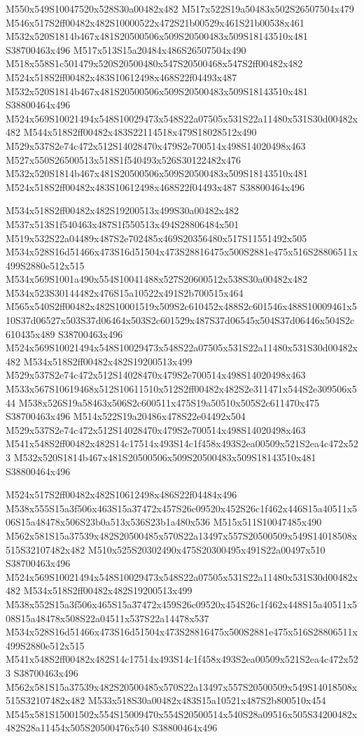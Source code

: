 \documentclass{article}
\begin{document}
\begin{multicols}{2}
M550x549S10047520x528S30a00482x482 M517x522S19a50483x502S26507504x479 M546x517S2ff00482x482S10000522x472S21b00529x461S21b00538x461 M532x520S1814b467x481S20500506x509S20500483x509S18143510x481 S38700463x496 M517x513S15a20484x486S26507504x490 M518x558S1c501479x520S20500480x547S20500468x547S2ff00482x482 M524x518S2ff00482x483S10612498x468S22f04493x487 M532x520S1814b467x481S20500506x509S20500483x509S18143510x481 S38800464x496 M524x569S10021494x548S10029473x548S22a07505x531S22a11480x531S30d00482x482 M544x518S2ff00482x483S22114518x479S18028512x490 M529x537S2e74c472x512S14028470x479S2e700514x498S14020498x463 M527x550S26500513x518S1f540493x526S30122482x476 M532x520S1814b467x481S20500506x509S20500483x509S18143510x481 M524x518S2ff00482x483S10612498x468S22f04493x487 S38800464x496

M534x518S2ff00482x482S19200513x499S30a00482x482 M537x513S1f540463x487S1f550513x494S28806484x501 M519x532S22a04489x487S2e702485x469S20356480x517S11551492x505 M534x528S16d51466x473S16d51504x473S28816475x500S2881e475x516S28806511x499S2880e512x515 M534x569S1001a490x554S10041488x527S20600512x538S30a00482x482 M534x523S30144482x476S15a10522x491S2b700515x464 M565x540S2ff00482x482S10001519x509S2c610452x488S2c601546x488S10009461x510S37d06527x503S37d06464x503S2c601529x487S37d06545x504S37d06446x504S2c610435x489 S38700463x496 M524x569S10021494x548S10029473x548S22a07505x531S22a11480x531S30d00482x482 M534x518S2ff00482x482S19200513x499 M529x537S2e74c472x512S14028470x479S2e700514x498S14020498x463 M533x567S10619468x512S10611510x512S2ff00482x482S2e311471x544S2e309506x544 M538x526S19a58463x506S2c600511x475S19a50510x505S2c611470x475 S38700463x496 M514x522S19a20486x478S22e04492x504 M529x537S2e74c472x512S14028470x479S2e700514x498S14020498x463 M541x548S2ff00482x482S14c17514x493S14c1f458x493S2ea00509x521S2ea4c472x523 M532x520S1814b467x481S20500506x509S20500483x509S18143510x481 S38800464x496

M524x517S2ff00482x482S10612498x486S22f04484x496 M538x555S15a3f506x463S15a37472x457S26c09520x452S26c1f462x446S15a40511x506S15a48478x506S23b0a513x536S23b1a480x536 M515x511S10047485x490 M562x581S15a37539x482S20500485x570S22a13497x557S20500509x549S14018508x515S32107482x482 M510x525S20302490x475S20300495x491S22a00497x510 S38700463x496 M524x569S10021494x548S10029473x548S22a07505x531S22a11480x531S30d00482x482 M534x518S2ff00482x482S19200513x499 M538x552S15a3f506x465S15a37472x459S26c09520x454S26c1f462x448S15a40511x508S15a48478x508S22a04511x537S22a14478x537 M534x528S16d51466x473S16d51504x473S28816475x500S2881e475x516S28806511x499S2880e512x515 M541x548S2ff00482x482S14c17514x493S14c1f458x493S2ea00509x521S2ea4c472x523 S38700463x496 M562x581S15a37539x482S20500485x570S22a13497x557S20500509x549S14018508x515S32107482x482 M533x518S30a00482x483S15a10521x487S2b800510x454 M545x581S15001502x554S15009470x554S20500514x540S28a09516x505S34200482x482S28a11454x505S20500476x540 S38800464x496


\end{multicols}
\end{document}
